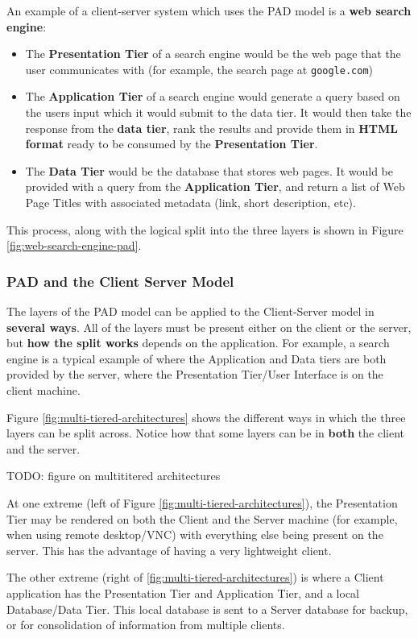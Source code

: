 \documentclass{article}
\begin{document}
An example of a client-server system which uses the PAD model is a \textbf{web search engine}:
\begin{itemize}
    \item The \textbf{Presentation Tier} of a search engine would be the web page that the user communicates with (for example, the search page at \texttt{google.com})
    \item The \textbf{Application Tier} of a search engine would generate a query based on the users input which it would submit to the data tier. It would then take the response from the \textbf{data tier}, rank the results and provide them in \textbf{HTML format} ready to be consumed by the \textbf{Presentation Tier}.
    \item The \textbf{Data Tier} would be the database that stores web pages. It would be provided with a query from the \textbf{Application Tier}, and return a list of Web Page Titles with associated metadata (link, short description, etc).
\end{itemize}
This process, along with the logical split into the three layers is shown in Figure \ref{fig:web-search-engine-pad}.


\subsubsection{PAD and the Client Server Model}

The layers of the PAD model can be applied to the Client-Server model in \textbf{several ways}. All of the layers must be present either on the client or the server, but \textbf{how the split works} depends on the application. For example, a search engine is a typical example of where the Application and Data tiers are both provided by the server, where the Presentation Tier/User Interface is on the client machine. 

Figure \ref{fig:multi-tiered-architectures} shows the different ways in which the three layers can be split across. Notice how that some layers can be in \textbf{both} the client and the server.

TODO: figure on multititered architectures

At one extreme (left of Figure \ref{fig:multi-tiered-architectures}), the Presentation Tier may be rendered on both the Client and the Server machine (for example, when using remote desktop/VNC) with everything else being present on the server. This has the advantage of having a very lightweight client.

The other extreme (right of \ref{fig:multi-tiered-architectures}) is where a Client application has the Presentation Tier and Application Tier, and a local Database/Data Tier. This local database is sent to a Server database for backup, or for consolidation of information from multiple clients. 
\end{document}
